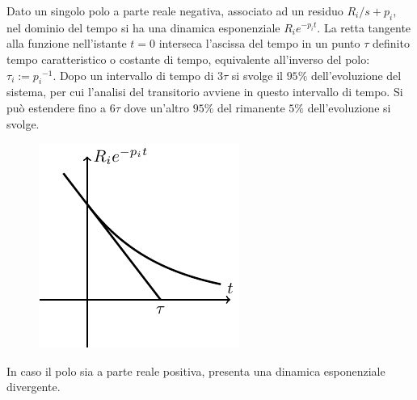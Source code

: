 \documentclass{article}
\numberwithin{equation}{subsection}
\begin{document}
Dato un singolo polo a parte reale negativa, associato ad un residuo ${R_i}/{s+p_i}$, nel dominio del tempo si ha una dinamica esponenziale $R_ie^{-p_it}$. La retta tangente alla funzione 
nell'istante $t=0$ interseca l'ascissa del tempo in un punto $\tau$ definito tempo 
caratteristico o costante di tempo, equivalente all'inverso del polo: $\tau_i:={p_i}^{-1}$. Dopo un intervallo di tempo di $3\tau$ si svolge il $95\%$ dell'evoluzione 
del sistema, per cui l'analisi del transitorio avviene in questo intervallo di tempo. Si può estendere fino a $6\tau$ dove un'altro $95\%$ del rimanente $5\%$ dell'evoluzione 
si svolge. 
\begin{figure}[H]%
    \centering
    \includegraphics{tempo-caratteristico.pdf}%
\end{figure}

In caso il polo sia a parte reale positiva, presenta una dinamica esponenziale divergente.
\end{document}
